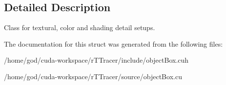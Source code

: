 \subsection{Detailed Description}
Class for textural, color and shading detail setups. 

The documentation for this struct was generated from the following files\+:\begin{DoxyCompactItemize}
\item 
/home/god/cuda-\/workspace/r\+T\+Tracer/include/object\+Box.\+cuh\item 
/home/god/cuda-\/workspace/r\+T\+Tracer/source/object\+Box.\+cu\end{DoxyCompactItemize}
